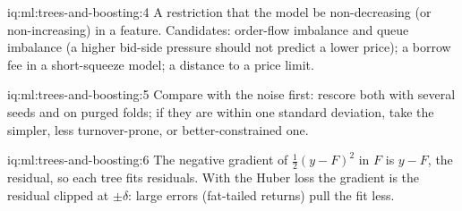 \begin{solution}{iq:ml:trees-and-boosting:4}
A restriction that the model be non-decreasing (or non-increasing) in a feature. Candidates: order-flow imbalance and
queue imbalance (a higher bid-side pressure should not predict a lower price); a borrow fee in a short-squeeze model; a
distance to a price limit.
\end{solution}

\begin{solution}{iq:ml:trees-and-boosting:5}
Compare with the noise first: rescore both with several seeds and on purged folds; if they are within one standard
deviation, take the simpler, less turnover-prone, or better-constrained one.
\end{solution}

\begin{solution}{iq:ml:trees-and-boosting:6}
The negative gradient of $\frac12(y - F)^2$ in $F$ is $y - F$, the residual, so each tree fits residuals. With the Huber
loss the gradient is the residual clipped at $\pm\delta$: large errors (fat-tailed returns) pull the fit less.
\end{solution}
